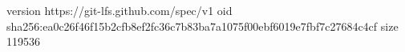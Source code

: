 version https://git-lfs.github.com/spec/v1
oid sha256:ea0c26f46f15b2cfb8ef2fc36c7b83ba7a1075f00ebf6019e7fbf7c27684c4cf
size 119536
